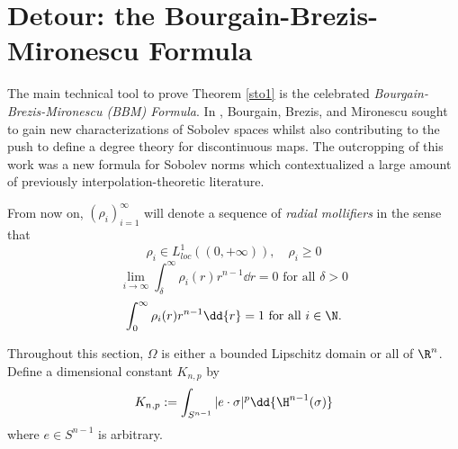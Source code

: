 \documentclass[../main.tex]{subfiles}
\begin{document}
\section{Detour: the Bourgain-Brezis-Mironescu Formula}

The main technical tool to prove Theorem \ref{sto1} is the celebrated \textit{Bourgain-Brezis-Mironescu (BBM) Formula}. In \cite{brezis:2001, brezis:2002}, Bourgain, Brezis, and Mironescu sought to gain new characterizations of Sobolev spaces whilst also contributing to the push to define a degree theory for discontinuous maps. The outcropping of this work was a new formula for Sobolev norms which contextualized a large amount of previously interpolation-theoretic literature.


\begin{definition}
From now on, $ (\rho_{i})_{i=1}^{\infty} $ will denote a sequence of \textit{radial mollifiers} in the sense that 
\begin{equation}
    \rho_{i}\in L^{1}_{loc}((0,+\infty)),\quad \rho_{i}\geq 0
\end{equation}
\begin{equation}
    \lim_{i\to\infty}\int_{\delta}^{\infty} \rho_{i}(r)r^{n-1}\dd{r} = 0 \text{ for all } \delta>0 
\end{equation}
\begin{equation}
    \int_{0}^{\infty}\rho_{i}(r)r^{n-1}\dd{r} = 1 \text{ for all } i\in \N.
\end{equation}


\end{definition}
Throughout this section, $ \Omega $ is either a bounded Lipschitz domain or all of $ \R^{n} $.
Define a dimensional constant $ K_{n,p} $ by 
\[
    K_{n,p}:= \int_{S^{n-1}} |e\cdot \sigma|^p \dd{\H^{n-1}(\sigma)}
\]
where $ e\in S^{n-1} $ is arbitrary.\\
\end{document}
